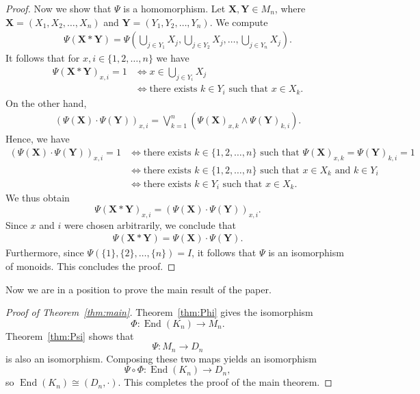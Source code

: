 \documentclass[pdflatex,sn-mathphys-num]{sn-jnl}%
\theoremstyle{thmstyleone}%
\theoremstyle{thmstyletwo}%
\theoremstyle{thmstylethree}%
\begin{document}
\begin{proof}
   Now we show that $\Psi$ is a homomorphism. Let $\mathbf{X}, \mathbf{Y} \in M_n$, where
   $\mathbf{X} = (X_1, X_2, \dots, X_n)$ and $\mathbf{Y} = (Y_1, Y_2, \dots, Y_n)$. We compute
   \begin{align*}
      \Psi(\mathbf{X} \ast \mathbf{Y}) = \Psi(\bigcup_{j \in Y_1} X_j, \bigcup_{j \in Y_2} X_j, \dots, \bigcup_{j \in Y_n} X_j).
   \end{align*}
   It follows that for $x, i \in \{1, 2, \dots, n\}$ we have 
   \begin{align*}
      \Psi(\mathbf{X} \ast \mathbf{Y})_{x, i} = 1 &\Leftrightarrow x \in \bigcup_{j\in Y_i}X_j \\
      &\Leftrightarrow \text{there exists } k \in Y_i \text{ such that } x \in X_k.
   \end{align*}
   On the other hand,
   \begin{align*}
      (\Psi(\mathbf{X}) \cdot \Psi(\mathbf{Y}))_{x, i} = \bigvee_{k=1}^n (\Psi(\mathbf{X})_{x, k} \land \Psi(\mathbf{Y})_{k, i}).
   \end{align*}
   Hence, we have
   \begin{align*}
      (\Psi(\mathbf{X}) \cdot \Psi(\mathbf{Y}))_{x, i} = 1 &\Leftrightarrow \text{there exists } k \in \{1, 2, \dots, n\} \text{ such that } \Psi(\mathbf{X})_{x, k} = \Psi(\mathbf{Y})_{k, i} = 1 \\
      &\Leftrightarrow \text{there exists } k \in \{1, 2, \dots, n\} \text{ such that } x \in X_k \text{ and } k \in Y_i \\
      &\Leftrightarrow \text{there exists } k \in Y_i \text{ such that } x \in X_k.
   \end{align*}
   We thus obtain
   \[
      \Psi(\mathbf{X} \ast \mathbf{Y})_{x, i} = (\Psi(\mathbf{X}) \cdot \Psi(\mathbf{Y}))_{x, i}.
   \]
   Since $x$ and $i$ were chosen arbitrarily, we conclude that
   \begin{align*}
      \Psi(\mathbf{X} \ast \mathbf{Y}) = \Psi(\mathbf{X}) \cdot \Psi(\mathbf{Y}).
   \end{align*}
   Furthermore, since $\Psi(\{1\}, \{2\}, \dots, \{n\}) = I$, it follows that $\Psi$ is an isomorphism of monoids. This concludes the proof.

\end{proof}

Now we are in a position to prove the main result of the paper.

\begin{proof}[Proof of Theorem~\ref{thm:main}]
   Theorem~\ref{thm:Phi} gives the isomorphism
   \[
      \Phi : \operatorname{End}(K_n) \rightarrow M_n.
   \]
   Theorem~\ref{thm:Psi} shows that
   \[
      \Psi : M_n \rightarrow D_n
   \]
   is also an isomorphism.  Composing these two maps yields an isomorphism
   \[
      \Psi \circ \Phi : \operatorname{End}(K_n) \rightarrow D_n,
   \]
   so \(\operatorname{End}(K_n) \cong (D_n,\cdot)\).  This completes the proof of the main theorem.  \qedhere
\end{proof}
\end{document}
